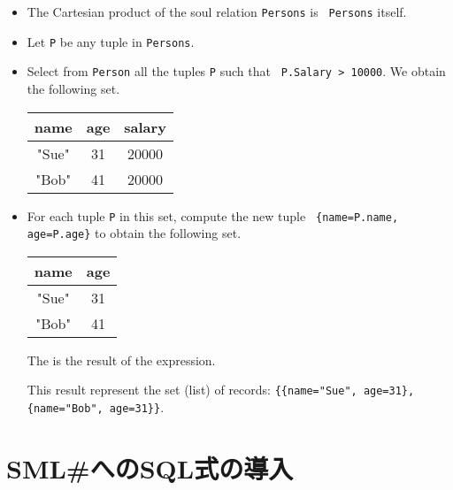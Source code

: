 \documentclass{jbook}
\newcommand{\txt}[2]{#1}
\newcommand{\smlsharp}{SML\#}
\begin{document}
\begin{itemize}
\item The Cartesian product of the soul relation {\tt Persons} is {\tt
Persons} itself.
\item Let {\tt P} be any tuple in {\tt Persons}.
\item Select from {\tt Person} all the tuples {\tt P} such that {\tt
P.Salary > 10000}.
	We obtain the following set.

\begin{center}
\begin{tabular}{|c|c|c|}
\hline
name & age & salary
\\\hline
"Sue" & 31 & 20000
\\\hline
"Bob" & 41 & 20000
\\\hline
\end{tabular}
\end{center}

\item For each tuple {\tt P} in this set, compute the new tuple {\tt
\{name=P.name, age=P.age\}} to obtain the following set.

\begin{center}
\begin{tabular}{|c|c|}
\hline
name & age
\\\hline
"Sue" & 31
\\\hline
"Bob" & 41
\\\hline
\end{tabular}
\end{center}
The is the result of the expression.
	
This result represent the set (list) of records:
{\tt \{\{name="Sue", age=31\}, \{name="Bob", age=31\}\}}.
\end{itemize}
\fi%

\section{\txt{\smlsharp{}へのSQL式の導入}{Integrating SQL in \smlsharp{}}}
\label{sec:tutorialIntoroducingSQL}
\end{document}
